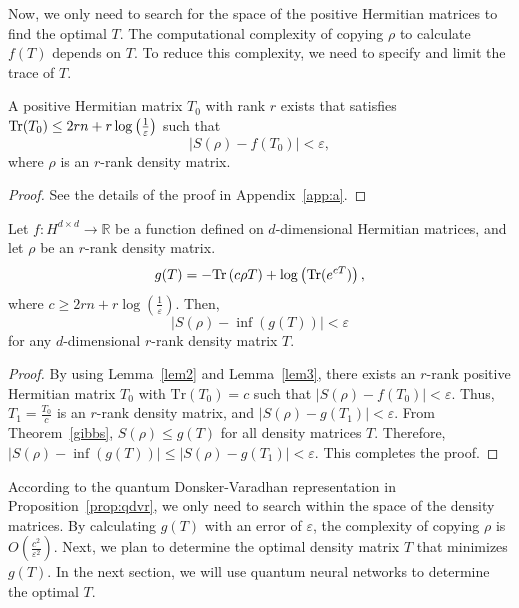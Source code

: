 \documentclass[aps,groupedaddress,superscriptaddress,amssymb,amsmath,amsbsy,amsfonts,twocolumn,pra]{revtex4}
\begin{document}
Now, we only need to search for the space of the positive Hermitian matrices to find the optimal $T$. The computational complexity of copying $\rho$ to calculate $f(T)$ depends on $T$. To reduce this complexity, we need to specify and limit the trace of $T$.

\begin{lemma} \label{lem3}
A positive Hermitian matrix $T_0$ with rank $r$ exists that satisfies $\mbox{$\textnormal{Tr}$}(T_0) \leq 2rn + r\log\left(\frac{1}{\varepsilon}\right)$ such that
\begin{equation} \label{trace reduction}
\left|S(\rho) - f(T_0)\right| < \varepsilon,
\end{equation}
where $\rho$ is an $r$-rank density matrix.
\end{lemma}

\begin{proof}
See the details of the proof in Appendix~\ref{app:a}.
\end{proof}

\begin{proposition} \label{prop:qdvr}
Let $f: H^{d \times d} \rightarrow \mathbb{R}$ be a function defined on $d$-dimensional Hermitian matrices, and let $\rho$ be an $r$-rank density matrix.
\begin{equation} \label{eq:qdv}
g(T) =-\mbox{$\textnormal{Tr}$}\left(c \rho T\right) + \log\left(\mbox{$\textnormal{Tr}$}(e^{cT})\right),
\end{equation}
where $c \geq 2rn + r\log\left(\frac{1}{\varepsilon}\right)$. Then,
\begin{equation} \label{qdv}
\left|S(\rho) - \inf(g(T))\right| < \varepsilon
\end{equation}
for any $d$-dimensional $r$-rank density matrix $T$.
\end{proposition}

\begin{proof}
By using Lemma~\ref{lem2} and Lemma~\ref{lem3}, there exists an $r$-rank positive Hermitian matrix $T_0$ with $\text{Tr}(T_0) = c$ such that $|S(\rho) - f(T_0)| < \varepsilon$. Thus, $T_1 = \frac{T_0}{c}$ is an $r$-rank density matrix, and $|S(\rho) - g(T_1)| < \varepsilon$. From Theorem~\ref{gibbs}, $S(\rho) \leq g(T)$ for all density matrices $T$. Therefore, $\left|S(\rho) - \inf(g(T))\right| \leq \left|S(\rho) - g(T_1)\right| < \varepsilon$. This completes the proof.
\end{proof}

According to the quantum Donsker-Varadhan representation in Proposition~\ref{prop:qdvr}, we only need to search within the space of the density matrices. By calculating $g(T)$ with an error of $\varepsilon$, the complexity of copying $\rho$ is $O(\frac{c^2}{\varepsilon^2})$. Next, we plan to determine the optimal density matrix $T$ that minimizes $g(T)$. In the next section, we will use quantum neural networks to determine the optimal $T$.
\bigskip
\end{document}
